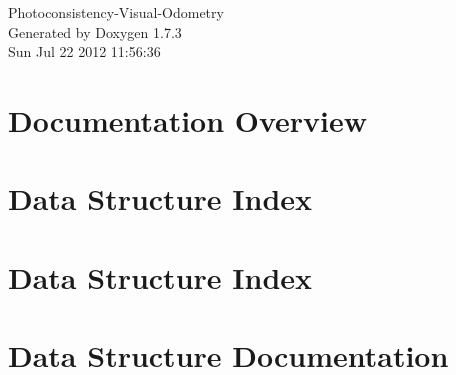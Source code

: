 \documentclass[a4paper]{book}
\begin{document}
\hypersetup{pageanchor=false}
\begin{titlepage}
\vspace*{7cm}
\begin{center}
{\Large Photoconsistency-\/Visual-\/Odometry }\\
\vspace*{1cm}
{\large Generated by Doxygen 1.7.3}\\
\vspace*{0.5cm}
{\small Sun Jul 22 2012 11:56:36}\\
\end{center}
\end{titlepage}
\clearemptydoublepage
{}
\tableofcontents
\clearemptydoublepage
{}
\hypersetup{pageanchor=true}
\chapter{Documentation Overview}
\label{index}\hypertarget{index}{}
\chapter{Data Structure Index}

\chapter{Data Structure Index}

\chapter{Data Structure Documentation}







\printindex
\end{document}
